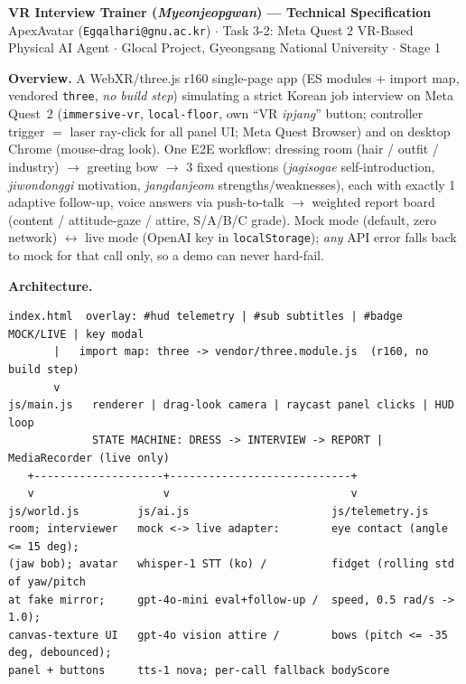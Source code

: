 \documentclass[10pt,a4paper]{article}
\begin{document}
\begin{center}
{\large\bfseries VR Interview Trainer (\emph{Myeonjeopgwan}) --- Technical Specification}\\[1pt]
{\footnotesize ApexAvatar (\texttt{Egqalhari@gnu.ac.kr}) \;$\cdot$\; Task 3-2: Meta Quest 2 VR-Based Physical AI Agent \;$\cdot$\; Glocal Project, Gyeongsang National University \;$\cdot$\; Stage 1}
\end{center}
\vspace{-2pt}

\textbf{Overview.} A WebXR/three.js r160 single-page app (ES modules + import map, vendored \texttt{three}, \emph{no build step}) simulating a strict Korean job interview on Meta Quest~2 (\texttt{immersive-vr}, \texttt{local-floor}, own ``VR \emph{ipjang}'' button; controller trigger $=$ laser ray-click for all panel UI; Meta Quest Browser) and on desktop Chrome (mouse-drag look). One E2E workflow: dressing room (hair / outfit / industry) $\rightarrow$ greeting bow $\rightarrow$ 3 fixed questions (\emph{jagisogae} self-introduction, \emph{jiwondonggi} motivation, \emph{jangdanjeom} strengths/weaknesses), each with exactly 1 adaptive follow-up, voice answers via push-to-talk $\rightarrow$ weighted report board (content / attitude-gaze / attire, S/A/B/C grade). Mock mode (default, zero network) $\leftrightarrow$ live mode (OpenAI key in \texttt{localStorage}); \emph{any} API error falls back to mock for that call only, so a demo can never hard-fail.

\textbf{Architecture.}
{\footnotesize
\begin{verbatim}
index.html  overlay: #hud telemetry | #sub subtitles | #badge MOCK/LIVE | key modal
       |   import map: three -> vendor/three.module.js  (r160, no build step)
       v
js/main.js   renderer | drag-look camera | raycast panel clicks | HUD loop
             STATE MACHINE: DRESS -> INTERVIEW -> REPORT | MediaRecorder (live only)
   +--------------------+----------------------------+
   v                    v                            v
js/world.js         js/ai.js                      js/telemetry.js
room; interviewer   mock <-> live adapter:        eye contact (angle <= 15 deg);
(jaw bob); avatar   whisper-1 STT (ko) /          fidget (rolling std of yaw/pitch
at fake mirror;     gpt-4o-mini eval+follow-up /  speed, 0.5 rad/s -> 1.0);
canvas-texture UI   gpt-4o vision attire /        bows (pitch <= -35 deg, debounced);
panel + buttons     tts-1 nova; per-call fallback bodyScore
\end{verbatim}}
\vspace{-4pt}
\end{document}
